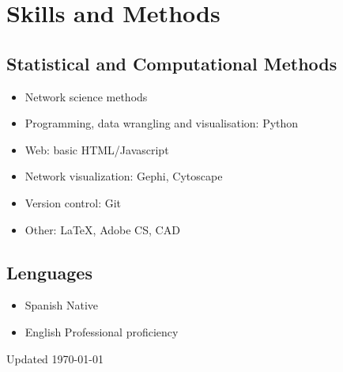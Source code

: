 \documentclass{academiccv}
\begin{document}



\section*{Skills and Methods}

\subsection*{Statistical and Computational Methods}

\begin{itemize}
	
\item Network science methods
\item Programming, data wrangling and visualisation: Python
\item Web: basic HTML/Javascript
\item Network visualization: Gephi, Cytoscape
\item Version control: Git
\item Other: \LaTeX, Adobe CS, CAD

\end{itemize}


\subsection*{Lenguages}

\begin{itemize}
	
\item Spanish \tab Native
\item English \tab Professional proficiency 

\end{itemize}



\begin{center}
\vspace{6em}
Updated \monthyeardate\today
\end{center}
\end{document}
